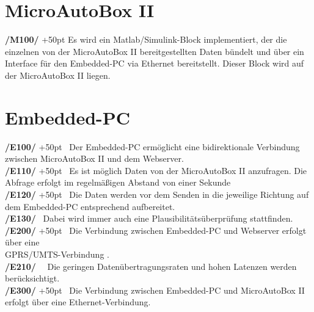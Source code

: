\documentclass[fontsize = 12pt, paper = a4]{scrreprt}
\begin{document}

\section{\gls{MicroAutoBox II}} 

\textbf{/M100/} 
\hangindent+50pt 
Es wird ein \gls{Matlab/Simulink-Block}  implementiert, der die einzelnen von der \gls{MicroAutoBox II} bereitgestellten Daten bündelt und über ein \gls{Interface}   für den \gls{Embedded-PC} via \gls{Ethernet}  bereitstellt. Dieser Block wird auf der  \gls{MicroAutoBox II} liegen. 



\section{\gls{Embedded-PC}} 

\textbf{/E100/}
\hangindent+50pt 
\ Der \gls{Embedded-PC} ermöglicht eine \gls{bidirektional}e Verbindung zwischen \gls{MicroAutoBox II} und dem Webserver. \\


\textbf{/E110/} 
\hangindent+50pt 
\ Es ist möglich Daten von der \gls{MicroAutoBox II} anzufragen. Die Abfrage erfolgt im regelmäßigen Abstand von einer Sekunde \\


\textbf{/E120/} 
\hangindent+50pt 
\ Die Daten werden vor dem Senden in die jeweilige Richtung auf dem  
\gls{Embedded-PC} entsprechend aufbereitet. \\


\textbf{/E130/}  
\ Dabei wird immer auch eine Plausibilitätsüberprüfung  stattfinden. \\

\textbf{/E200/}
\hangindent+50pt 
\ Die Verbindung zwischen \gls{Embedded-PC} und Webserver erfolgt über eine \\ \gls{GPRS}/\gls{UMTS}-Verbindung . \\

\textbf{/E210/} 
\ \ Die geringen Datenübertragungsraten und hohen \gls{Latenz}en  werden berücksichtigt. \\

\textbf{/E300/} 
\hangindent+50pt 
\ Die Verbindung zwischen \gls{Embedded-PC} und \gls{MicroAutoBox II} erfolgt über eine \gls{Ethernet}-Verbindung. \newpage
\end{document}
